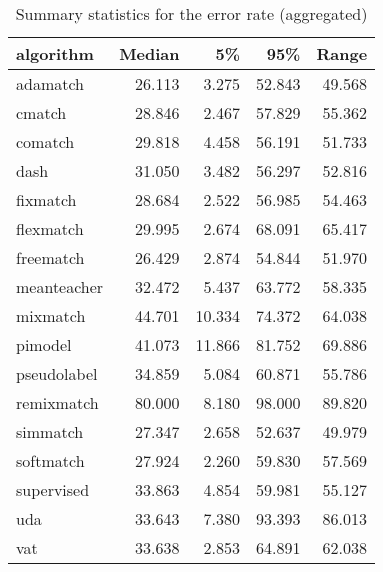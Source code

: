 \begin{table}[!h]

\caption{\label{tab:summarystatisticstable}Summary statistics for the error rate (aggregated)}
\centering
\begin{tabular}[t]{lrrrr}
\toprule
algorithm & Median & 5\% & 95\% & Range\\
\midrule
adamatch & 26.113 & 3.275 & 52.843 & 49.568\\
cmatch & 28.846 & 2.467 & 57.829 & 55.362\\
comatch & 29.818 & 4.458 & 56.191 & 51.733\\
dash & 31.050 & 3.482 & 56.297 & 52.816\\
fixmatch & 28.684 & 2.522 & 56.985 & 54.463\\
flexmatch & 29.995 & 2.674 & 68.091 & 65.417\\
freematch & 26.429 & 2.874 & 54.844 & 51.970\\
meanteacher & 32.472 & 5.437 & 63.772 & 58.335\\
mixmatch & 44.701 & 10.334 & 74.372 & 64.038\\
pimodel & 41.073 & 11.866 & 81.752 & 69.886\\
pseudolabel & 34.859 & 5.084 & 60.871 & 55.786\\
remixmatch & 80.000 & 8.180 & 98.000 & 89.820\\
simmatch & 27.347 & 2.658 & 52.637 & 49.979\\
softmatch & 27.924 & 2.260 & 59.830 & 57.569\\
supervised & 33.863 & 4.854 & 59.981 & 55.127\\
uda & 33.643 & 7.380 & 93.393 & 86.013\\
vat & 33.638 & 2.853 & 64.891 & 62.038\\
\bottomrule
\end{tabular}
\end{table}
